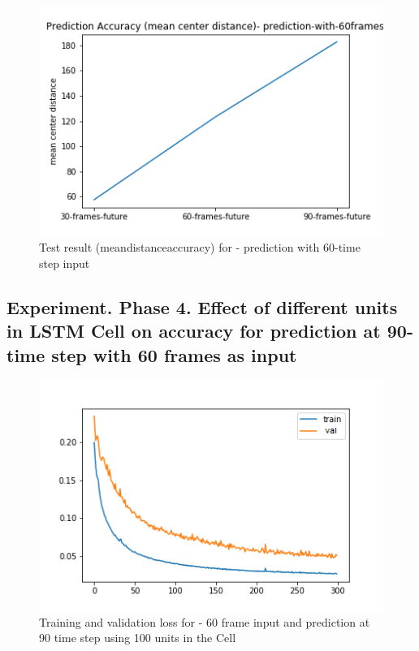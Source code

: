 \begin{figure}[H] 
\includegraphics[scale=0.7]{prediction-with-60frames-mean_distance_accuracy}
\begin{center}
\caption{Test result (mean\textunderscore distance\textunderscore accuracy) for - prediction with 60-time step
 input }
\label{60-mcd}
\end{center}
\end{figure}

\subsection{Experiment. Phase 4. Effect of different units in LSTM Cell on accuracy for prediction at 90-time step with 60 frames as input}

\begin{figure}[H] 
\includegraphics[scale=0.7]{conf14_300e_60_90ffuture_100unit}
\begin{center}
\caption{Training and validation loss for - 60 frame input and prediction at 90 time step using 100 units in the Cell}
\label{60-90-100unit}
\end{center}
\end{figure}

